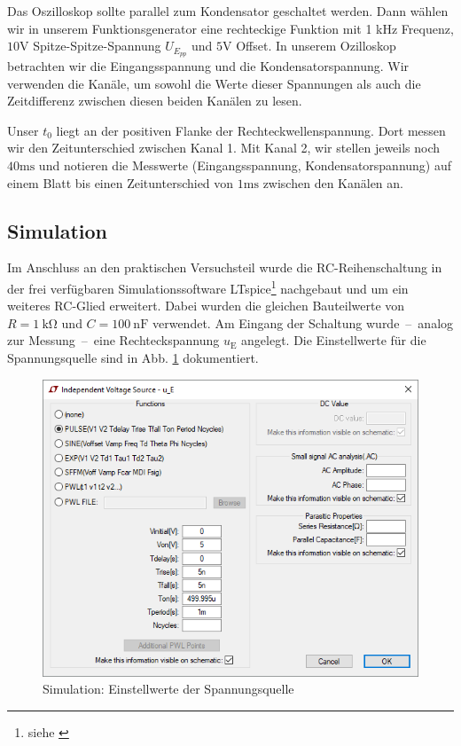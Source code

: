 Das Oszilloskop sollte parallel zum Kondensator geschaltet werden. Dann wählen wir in unserem Funktionsgenerator eine
rechteckige Funktion mit 1 kHz Frequenz, $10\si{\volt}$ Spitze-Spitze-Spannung $U_{E_{pp}}$ und $5\si{\volt}$ Offset. In unserem Ozilloskop betrachten wir
die Eingangsspannung und die Kondensatorspannung. Wir verwenden die Kanäle, um sowohl die Werte dieser Spannungen als
auch die Zeitdifferenz zwischen diesen beiden Kanälen zu lesen.

Unser $t_0$ liegt an der positiven Flanke der Rechteckwellenspannung. Dort messen wir den Zeitunterschied zwischen Kanal 1. Mit
Kanal 2, wir stellen jeweils noch $40\si{\milli\second}$ und notieren die Messwerte (Eingangsspannung, Kondensatorspannung) auf einem Blatt
bis einen Zeitunterschied von $1\si{\milli\second}$ zwischen den Kanälen an.
%
%
\newpage
\subsection{Simulation}
\label{subsec:3_Simulation}
%
Im Anschluss an den praktischen Versuchsteil wurde die RC-Reihenschaltung in der frei verfügbaren Simulationssoftware LTspice\footnote{siehe \cite{src:LTspice}} nachgebaut und um ein weiteres RC-Glied erweitert. Dabei wurden die gleichen Bauteilwerte von $R = \SI{1}{\kilo\ohm}$ und $C = \SI{100}{\nano\farad}$ verwendet. Am Eingang der Schaltung wurde~--~analog zur Messung~--~eine Rechteckspannung $u_\mathrm{E}$ angelegt. Die Einstellwerte für die Spannungsquelle sind in Abb. \ref{fig:3_Sim_Spannungsquelle} dokumentiert.
%
\begin{figure}[H]
  \centering
  \includegraphics[width=0.9\linewidth]{src/3_Sim_Spannungsquelle.png}
  \caption{Simulation: Einstellwerte der Spannungsquelle}
  \label{fig:3_Sim_Spannungsquelle}
\end{figure}

